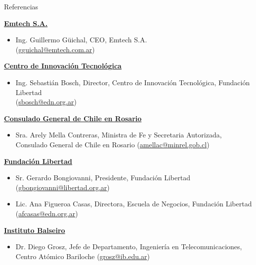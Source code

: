 \documentclass{resume} %
\begin{document}
\begin{rSection}{Referencias}
    \begin{enumerate}[label={[\arabic*]}]
        \item \label{emtech} \href{http://emtech.com.ar/}{\textbf{Emtech S.A.}}
              \begin{itemize}
                  \item Ing. Guillermo Güichal, CEO, Emtech S.A.\\(\href{mailto:gguichal@emtech.com.ar}{gguichal@emtech.com.ar})
              \end{itemize}
        \item \label{cit} \href{https://www.centroit.org.ar/}{\textbf{Centro de Innovación Tecnológica}}
              \begin{itemize}
                  \item Ing. Sebastián Bosch, Director, Centro de Innovación Tecnológica, Fundación Libertad\\(\href{mailto:sbosch@edn.org.ar}{sbosch@edn.org.ar})
              \end{itemize}
        \item \label{chile} \href{https://chile.gob.cl/rosario/}{\textbf{Consulado General de Chile en Rosario}}
              \begin{itemize}
                  \item Sra. Arely Mella Contreras, Ministra de Fe y Secretaria Autorizada, Consulado General de Chile en Rosario (\href{mailto:amellac@minrel.gob.cl}{amellac@minrel.gob.cl})
              \end{itemize}
        \item \label{funlib} \href{https://libertad.org.ar/}{\textbf{Fundación Libertad}}
              \begin{itemize}
                  \item Sr. Gerardo Bongiovanni, Presidente, Fundación Libertad (\href{mailto:gbongiovanni@libertad.org.ar}{gbongiovanni@libertad.org.ar})
                  \item Lic. Ana Figueroa Casas, Directora, Escuela de Negocios, Fundación Libertad\\(\href{mailto:afcasas@edn.org.ar}{afcasas@edn.org.ar})
              \end{itemize}
        \item \label{ib} \href{https://www.ib.edu.ar/}{\textbf{Instituto Balseiro}}
              \begin{itemize}
                  \item Dr. Diego Grosz, Jefe de Departamento, Ingeniería en Telecomunicaciones, Centro Atómico Bariloche (\href{mailto:grosz@ib.edu.ar}{grosz@ib.edu.ar})

\end{itemize}
\end{enumerate}
\end{rSection}
\end{document}
